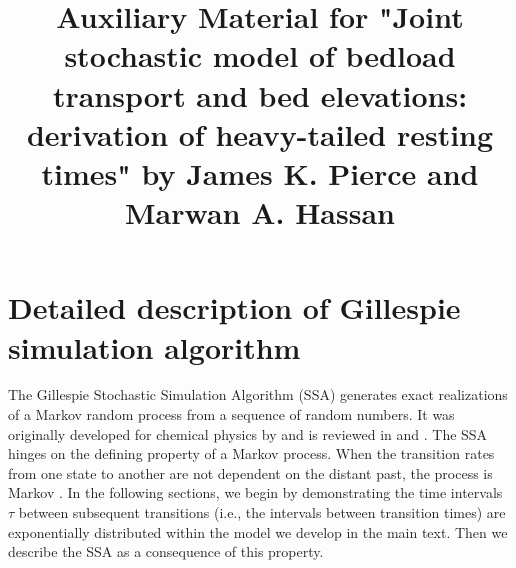 \documentclass[11pt]{article}
\date{} %
\begin{document}
\title{Auxiliary Material for "Joint stochastic model of bedload transport and bed elevations: derivation of heavy-tailed resting times" by James K. Pierce and Marwan A. Hassan}
\maketitle

\section*{Detailed description of Gillespie simulation algorithm}

The Gillespie Stochastic Simulation Algorithm (SSA) generates exact realizations of a Markov random process from a sequence of random numbers.
It was originally developed for chemical physics by \citet{Gillespie1977} and is reviewed in \citet{Gillespie1992} and \citet{Gillespie2007}.
The SSA hinges on the defining property of a Markov process. When the transition rates from one state to another are not dependent on the distant past, the process is Markov \citep[e.g.,][]{Cox1965}.
In the following sections, we begin by demonstrating the time intervals $\tau$ between subsequent transitions (i.e., the intervals between transition times) are exponentially distributed within the model we develop in the main text. Then we describe the SSA as a consequence of this property.
\end{document}
